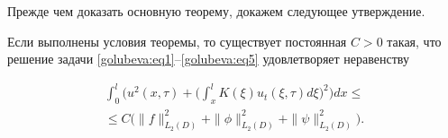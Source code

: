 \smallskip



  Прежде чем доказать основную теорему, докажем следующее утверждение.

\begin{lemma}

Если выполнены условия теоремы, то существует постоянная $C>0$ такая, что решение задачи \eqref{golubeva:eq1}--\eqref{golubeva:eq5} удовлетворяет неравенству

\begin{multline}

\label{golubeva:eq6}

\int _{0}^{l}\biggl(u^{2}(x, \tau )+\biggl(\int _{x}^{l}K(\xi )u_{t}(\xi , \tau )d\xi \biggr)^{2}\biggr) dx \leq \\

\leq C \biggl(\parallel f\parallel ^{2}_{L_{2}(D)}+\parallel \phi \parallel^{2}_{L_{2}(D)} +\parallel \psi \parallel^{2}_{L_{2}(D)}\biggr).

\end{multline}

\end{lemma}



